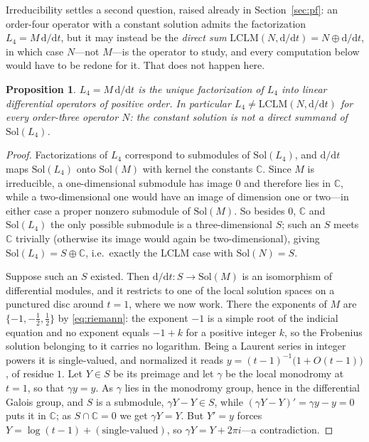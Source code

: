 \documentclass[cntp]{ipart}
\newcommand{\rmd}{\mathrm{d}}
\theoremstyle{plain}
\newtheorem{prop}[thm]{Proposition}
\theoremstyle{remark}
\begin{document}
Irreducibility settles a second question, raised already in Section~\ref{sec:pf}: an order-four operator
with a constant solution admits the factorization $L_4=M\,\rmd/\rmd t$, but it may instead be the
\emph{direct sum} $\mathrm{LCLM}(N,\rmd/\rmd t)=N\oplus\rmd/\rmd t$, in which case $N$---not $M$---is the
operator to study, and every computation below would have to be redone for it. That does not happen here.

\begin{prop}\label{prop:unique}
$L_4=M\,\rmd/\rmd t$ is the unique factorization of $L_4$ into linear differential operators of positive
order. In particular $L_4\neq\mathrm{LCLM}(N,\rmd/\rmd t)$ for every order-three operator $N$: the constant
solution is not a direct summand of $\mathrm{Sol}(L_4)$.
\end{prop}

\begin{proof}
Factorizations of $L_4$ correspond to submodules of $\mathrm{Sol}(L_4)$, and $\rmd/\rmd t$ maps
$\mathrm{Sol}(L_4)$ onto $\mathrm{Sol}(M)$ with kernel the constants $\mathbb{C}$. Since $M$ is irreducible, a
one-dimensional submodule has image $0$ and therefore lies in $\mathbb{C}$, while a two-dimensional one would
have an image of dimension one or two---in either case a proper nonzero submodule of $\mathrm{Sol}(M)$. So besides $0$, $\mathbb{C}$ and
$\mathrm{Sol}(L_4)$ the only possible submodule is a three-dimensional $S$; such an $S$ meets $\mathbb{C}$
trivially (otherwise its image would again be two-dimensional), giving $\mathrm{Sol}(L_4)=S\oplus\mathbb{C}$,
i.e.\ exactly the LCLM case with $\mathrm{Sol}(N)=S$.

Suppose such an $S$ existed. Then $\rmd/\rmd t\colon S\to\mathrm{Sol}(M)$ is an isomorphism of differential
modules, and it restricts to one of the local solution spaces on a punctured disc around $t=1$, where we now
work. There the exponents of $M$ are $\{-1,-\tfrac12,\tfrac12\}$ by \eqref{eq:riemann}: the exponent $-1$ is a
simple root of the indicial equation and no exponent equals $-1+k$ for a positive integer $k$, so the Frobenius
solution belonging to it carries no logarithm. Being a Laurent series in integer powers it is single-valued,
and normalized it reads $y=(t-1)^{-1}\big(1+O(t-1)\big)$, of residue $1$.
Let $Y\in S$ be its preimage and let $\gamma$ be the local monodromy at $t=1$, so that $\gamma y=y$. As $\gamma$
lies in the monodromy group, hence in the differential Galois group, and $S$ is a submodule,
$\gamma Y-Y\in S$, while $(\gamma Y-Y)'=\gamma y-y=0$ puts it in $\mathbb{C}$; as $S\cap\mathbb{C}=0$ we get
$\gamma Y=Y$. But $Y'=y$ forces $Y=\log(t-1)+(\text{single-valued})$, so $\gamma Y=Y+2\pi i$---a contradiction.
\end{proof}
\end{document}

